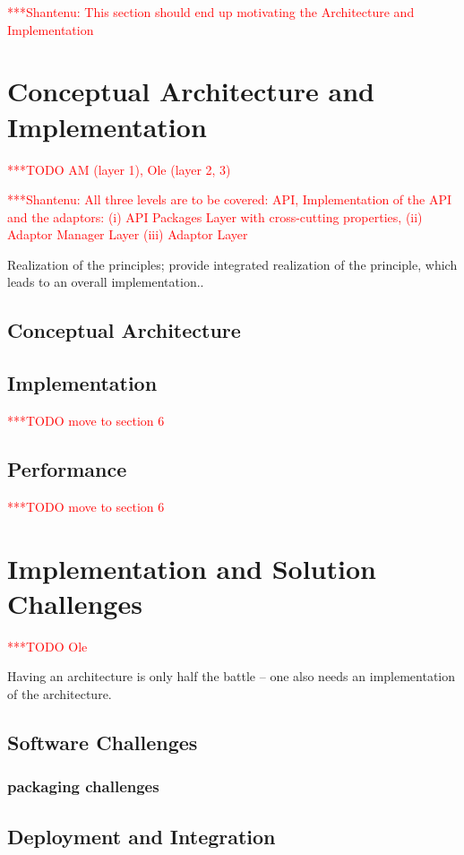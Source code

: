 \documentclass[a4paper,10pt]{article}
\newcommand{\todo}[1]{     {\textcolor{red}  { ***TODO      #1 }}}
\newcommand{\jhanote}[1]{  {\textcolor{red}  { ***Shantenu: #1 }}}
\newcommand{\todo}[1]{}
\newcommand{\jhanote}[1]{}
\begin{document}
\jhanote{This section should end up motivating the Architecture and
 Implementation}

\section{Conceptual Architecture and Implementation} \todo{AM (layer 1), Ole (layer 2, 3)}

\jhanote{All three levels are to be covered: API, Implementation of
  the API and the adaptors: (i) API Packages Layer with cross-cutting
  properties, (ii) Adaptor Manager Layer (iii) Adaptor Layer}

 Realization of the principles; provide integrated realization of the
 principle, which leads to an overall implementation..

 \subsection{Conceptual Architecture}

 \subsection{Implementation}
  
  \todo{move to section 6}

 \subsection{Performance}

  \todo{move to section 6}


\section{Implementation and Solution Challenges}\todo{Ole}

Having an architecture is only half the battle -- one also needs an
implementation of the architecture.


\subsection{Software Challenges}

\subsubsection{packaging challenges}
\subsection{Deployment and Integration} 
\end{document}
